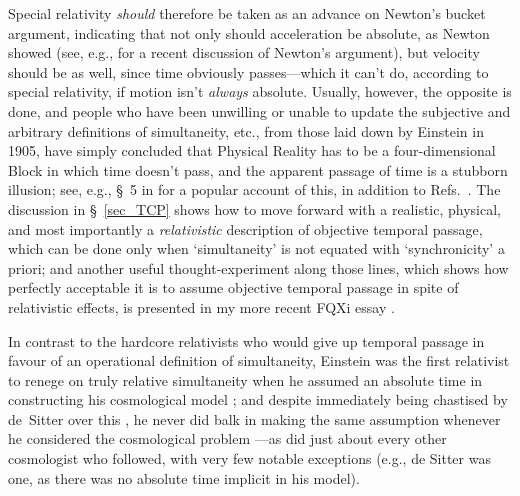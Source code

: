 \documentclass[11pt]{article}
\begin{document}
\begin{appendix}
Special relativity \textit{should} therefore be taken as an advance on Newton's bucket argument, indicating that not only should acceleration be absolute, as Newton showed (see, e.g., \cite{Maudlin2012} for a recent discussion of Newton's argument), but velocity should be as well, since time obviously passes---which it can't do, according to special relativity, if motion isn't \textit{always} absolute. Usually, however, the opposite is done, and people who have been unwilling or unable to update the subjective and arbitrary definitions of simultaneity, etc., from those laid down by Einstein in 1905, have simply concluded that Physical Reality has to be a four-dimensional Block in which time doesn't pass, and the apparent passage of time is a stubborn illusion; see, e.g., \S~5 in \cite{Greene2004} for a popular account of this, in addition to Refs.~\cite{Putnam1967,Minkowski1908,Foelsing1997,Weyl1949,Geroch1978}. The discussion in \S~\ref{sec_TCP} shows how to move forward with a realistic, physical, and most importantly a \textit{relativistic} description of objective temporal passage, which can be done only when `simultaneity' is not equated with `synchronicity' a priori; and another useful thought-experiment along those lines, which shows how perfectly acceptable it is to assume objective temporal passage in spite of relativistic effects, is presented in my more recent FQXi essay \cite{Janzen2013}.

In contrast to the hardcore relativists who would give up temporal passage in favour of an operational definition of simultaneity, Einstein was the first relativist to renege on truly relative simultaneity when he assumed an absolute time in constructing his cosmological model \cite{Einstein1917}; and despite immediately being chastised by de~Sitter over this \cite{deSitter1917a}, he never did balk in making the same assumption whenever he considered the cosmological problem \cite{Einstein1931b,Einstein1932,Einstein1945}---as did just about every other cosmologist who followed, with very few notable exceptions (e.g., de Sitter \cite{deSitter1917a,deSitter1917} was one, as there was no absolute time implicit in his model). 


\end{appendix}
\end{document}
